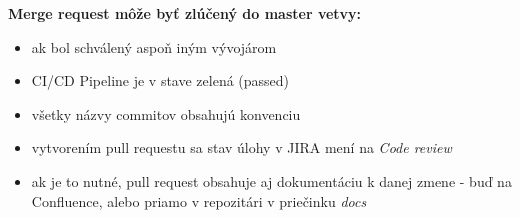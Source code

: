 \documentclass{article}
\begin{document}
    \bigskip

    \textbf{Merge request môže byť zlúčený do master vetvy:}
    \begin{itemize}
        \item ak bol schválený aspoň iným vývojárom
        \item CI/CD Pipeline je v stave zelená (passed)
        \item všetky názvy commitov obsahujú konvenciu
        \item vytvorením pull requestu sa stav úlohy v JIRA mení na \emph{Code review}
        \item ak je to nutné, pull request obsahuje aj dokumentáciu k danej zmene - buď na Confluence, alebo priamo v repozitári v priečinku \emph{docs}
    \end{itemize}
\end{document}
